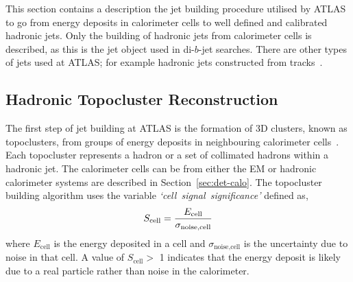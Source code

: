 This section contains a description the jet building procedure utilised by ATLAS
to go from energy deposits in calorimeter cells to well defined and calibrated hadronic jets.
Only the building of hadronic jets from calorimeter cells is described,
as this is the jet object used in di-$b$-jet searches.
There are other types of jets used at ATLAS; for example
hadronic jets constructed from tracks~\cite{obj-Hbb_exotic}.

\newpage
\subsection{Hadronic Topocluster Reconstruction}
\label{sec:obj-jets_topo}

The first step of jet building at ATLAS is the formation of 3D clusters, known as topoclusters, from groups of energy deposits in neighbouring calorimeter cells~\cite{obj-jets_topo}.
Each topocluster represents a hadron or a set of collimated hadrons within a hadronic jet.
The calorimeter cells can be from either the EM or hadronic calorimeter systems are described in Section~\ref{sec:det-calo}.
The topocluster building algorithm uses the variable \mbox{\textit{`cell signal significance'}} defined as, 
\begin{equation}
  \vspace{0.2em}
  {S_{\text{cell}} = \frac{E_{\text{cell}}}{\sigma_{\text{noise,cell}}}}
\end{equation}
where $E_{\text{cell}}$ is the energy deposited in a cell
and $\sigma_{\text{noise,cell}}$ is the uncertainty due to noise in that cell.
A value of $S_{\text{cell}} >$ 1 indicates that the energy deposit is likely due to a real particle rather than noise in the calorimeter.

